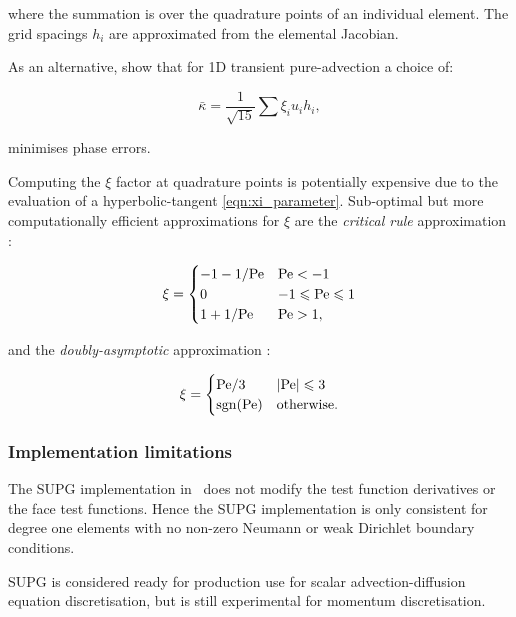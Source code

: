 where the summation is over the quadrature points of an individual element. The
grid spacings $h_i$ are approximated from the elemental Jacobian.

As an alternative, \citet{raymond1976} show that for
1D transient pure-advection a choice of:

\begin{equation}\label{eqn:md_nu_bar_transient}
  \bar{\kappa} = \frac{1}{\sqrt{15}} \sum{\xi_i u_i h_i},
\end{equation}

minimises phase errors.

Computing the $\xi$ factor at quadrature points is potentially expensive due to
the evaluation of a hyperbolic-tangent \eqref{eqn:xi_parameter}. Sub-optimal but more computationally
efficient approximations for $\xi$ are the \emph{critical rule} approximation \citep{brooks1982}:

\begin{equation}
  \xi = \begin{cases}
          -1 - 1 / \mathrm{Pe}  & \mathrm{Pe} < -1 \\
          0             & -1 \leqslant \mathrm{Pe} \leqslant 1 \\
          1 + 1 / \mathrm{Pe}   & \mathrm{Pe} > 1,
        \end{cases}
\end{equation}

and the \emph{doubly-asymptotic} approximation \citep{DoneaBook}:

\begin{equation}
  \xi = \begin{cases}
          \mathrm{Pe} / 3  & \left| \mathrm{Pe} \right| \leqslant 3 \\
          \operatorname{sgn}(\mathrm{Pe})  & \textrm{otherwise}.
        \end{cases}
\end{equation}

\subsubsection{Implementation limitations}

The SUPG implementation in \fluidity\ does not modify the test function derivatives
or the face test functions. Hence the SUPG implementation is only consistent
for degree one elements with no non-zero Neumann or weak Dirichlet boundary
conditions.

SUPG is considered ready for production use for scalar advection-diffusion
equation discretisation, but is still experimental for momentum discretisation.

